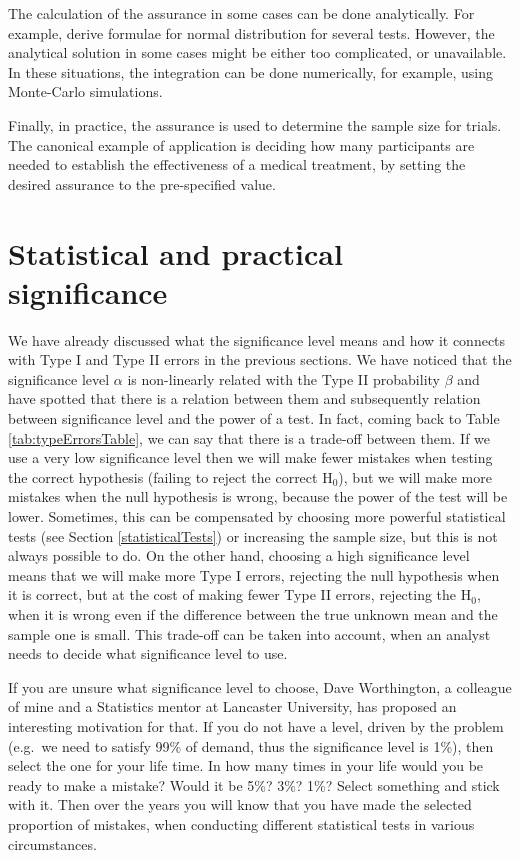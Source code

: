 \documentclass[
]{book}
\theoremstyle{definition}
\theoremstyle{definition}
\theoremstyle{definition}
\theoremstyle{definition}
\theoremstyle{remark}
\begin{document}
The calculation of the assurance in some cases can be done analytically. For example, \citet{OHagan2005} derive formulae for normal distribution for several tests. However, the analytical solution in some cases might be either too complicated, or unavailable. In these situations, the integration can be done numerically, for example, using Monte-Carlo simulations.

Finally, in practice, the assurance is used to determine the sample size for trials. The canonical example of application is deciding how many participants are needed to establish the effectiveness of a medical treatment, by setting the desired assurance to the pre-specified value.

\section{Statistical and practical significance}\label{significance}

We have already discussed what the significance level means and how it connects with Type I and Type II errors in the previous sections. We have noticed that the significance level \(\alpha\) is non-linearly related with the Type II probability \(\beta\) and have spotted that there is a relation between them and subsequently relation between significance level and the power of a test. In fact, coming back to Table \ref{tab:typeErrorsTable}, we can say that there is a trade-off between them. If we use a very low significance level then we will make fewer mistakes when testing the correct hypothesis (failing to reject the correct H\(_0\)), but we will make more mistakes when the null hypothesis is wrong, because the power of the test will be lower. Sometimes, this can be compensated by choosing more powerful statistical tests (see Section \ref{statisticalTests}) or increasing the sample size, but this is not always possible to do. On the other hand, choosing a high significance level means that we will make more Type I errors, rejecting the null hypothesis when it is correct, but at the cost of making fewer Type II errors, rejecting the H\(_0\), when it is wrong even if the difference between the true unknown mean and the sample one is small. This trade-off can be taken into account, when an analyst needs to decide what significance level to use.

If you are unsure what significance level to choose, Dave Worthington, a colleague of mine and a Statistics mentor at Lancaster University, has proposed an interesting motivation for that. If you do not have a level, driven by the problem (e.g.~we need to satisfy 99\% of demand, thus the significance level is 1\%), then select the one for your life time. In how many times in your life would you be ready to make a mistake? Would it be 5\%? 3\%? 1\%? Select something and stick with it. Then over the years you will know that you have made the selected proportion of mistakes, when conducting different statistical tests in various circumstances.
\end{document}
